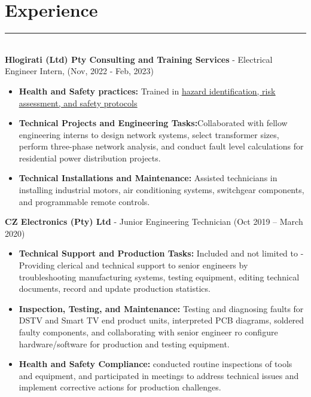\documentclass[12pt]{article}
\begin{document}
\vspace{-3mm}\section*{\fontsize{14}{1}\selectfont\color{color_29791}Experience}\vspace{-9pt} 
\rule{\textwidth}{0.4pt}
\vspace{2pt}
\\\textbf{Hlogirati (Ltd) Pty Consulting and Training Services} - Electrical Engineer Intern, (Nov, 2022 - Feb, 2023)
\vspace{-3mm}
\begin{itemize}
  \item \textbf{Health and Safety practices:} Trained in \href{https://drive.google.com/file/d/1i5SDy8WoBzwGOmAEAcxJzVyCb1c7Gfqq/view?usp=sharing}{\underline{hazard identification, risk assessment, and safety protocols}}
  \vspace{-3mm}
  \item \textbf{Technical Projects and Engineering Tasks:}Collaborated with fellow engineering interns to design network systems, select transformer sizes, perform three-phase network analysis, and conduct fault level calculations for residential power distribution projects.
  \vspace{-3mm}
  \item \textbf{Technical Installations and Maintenance:} Assisted technicians in installing industrial motors, air conditioning systems, switchgear components, and programmable remote controls.
\end{itemize}

\vspace{0mm}
\hspace{-7mm}\textbf{ CZ Electronics (Pty) Ltd} - Junior Engineering Technician (Oct 2019 – March 2020)
\vspace{-3mm}
\begin{itemize}
  \item \textbf{Technical Support and Production Tasks:} Included and not limited to - Providing clerical and technical support to senior engineers by troubleshooting manufacturing systems, testing equipment, editing technical documents, record and update production statistics.
  \vspace{-3mm}
  \item \textbf{Inspection, Testing, and Maintenance:} Testing and diagnosing faults for DSTV and Smart TV end product units, interpreted PCB  diagrams, soldered faulty components, and collaborating with senior engineer ro configure hardware/software for production and testing equipment. 
  \vspace{-3mm}
  \item \textbf{Health and Safety Compliance:} conducted routine inspections of tools and equipment, and participated in meetings to address technical issues and implement corrective actions for production challenges.
\end{itemize}
\end{document}
